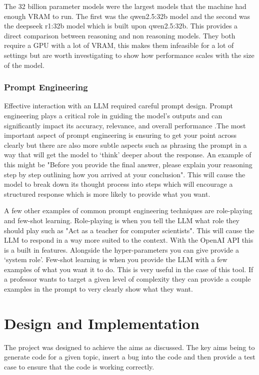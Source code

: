 \documentclass[12pt]{extarticle}
\begin{document}
The 32 billion parameter models were the largest models that the machine had enough VRAM to run. The first was the qwen2.5:32b model and the second was the deepseek r1:32b model which is built upon qwen2.5:32b. This provides a direct comparison between reasoning and non reasoning models. They both require a GPU with a lot of VRAM, this makes them infeasible for a lot of settings but are worth investigating to show how performance scales with the size of the model.

\subsubsection{Prompt Engineering}

Effective interaction with an LLM required careful prompt design. Prompt engineering plays a critical role in guiding the model's outputs and can significantly impact its accuracy, relevance, and overall performance .The most important aspect of prompt engineering is ensuring to get your point across clearly but there are also more subtle aspects such as phrasing the prompt in a way that will get the model to `think' deeper about the response. An example of this might be "Before you provide the final answer, please explain your reasoning step by step outlining how you arrived at your conclusion". This will cause the model to break down its thought process into steps which will encourage a structured response which is more likely to provide what you want. 

A few other examples of common prompt engineering techniques are role-playing and few-shot learning. Role-playing is when you tell the LLM what role they should play such as "Act as a teacher for computer scientists". This will cause the LLM to respond in a way more suited to the context. With the OpenAI API this is a built in features. Alongside the hyper-parameters you can give provide a `system role'. Few-shot learning is when you provide the LLM with a few examples of what you want it to do. This is very useful in the case of this tool. If a professor wants to target a given level of complexity they can provide a couple examples in the prompt to very clearly show what they want.

\newpage
\section{Design and Implementation}

The project was designed to achieve the aims as discussed. The key aims being to generate code for a given topic, insert a bug into the code and then provide a test case to ensure that the code is working correctly. 
\end{document}
